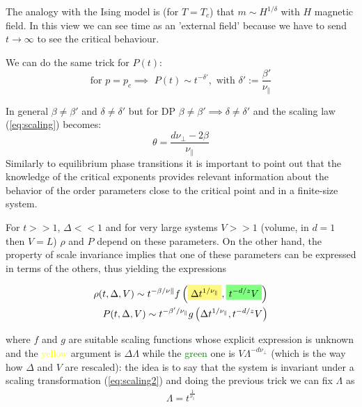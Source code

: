 \documentclass[\main/main.tex]{subfiles}
\begin{document}
The analogy with the Ising model is (for $T=T_c$) that $m\sim H^{1/\delta}$ with $H$ magnetic field. In this view we can see time as an 'external field' because we have to send $t \to \infty$ to see the critical behaviour.

We can do the same trick for $P(t)$:
\begin{equation}
    \text{for} \,\, p=p_c \implies\,\, P(t)\sim t^{-\delta'},\,\, \text{with} \,\, \delta':=\frac{\beta'}{\nu_\|}
\end{equation}

In general $\beta\neq \beta'$ and $\delta \neq \delta'$ but for DP $\beta\neq \beta' \implies \delta \neq \delta'$ and the scaling law (\ref{eq:scaling}) becomes:
\begin{equation}
    \theta=\frac{d\nu_\perp - 2\beta}{\nu_\|}
\end{equation}
Similarly to equilibrium phase transitions it is important to point out that the knowledge of the critical exponents provides relevant information about the behavior of the order parameters close to the critical point and in a finite-size system.

For $t>>1$, $\Delta << 1$ and for very large systems $V>>1$ (volume, in $d=1$ then $V=L$) $\rho$ and $P$ depend on these parameters. On the other hand, the property of scale invariance implies that one of these parameters can be expressed in terms of the others, thus yielding the expressions

\begin{align}
\rho(t, \Delta, V) \sim t^{-\beta / \nu \|} f\left(\hlc{yellow}{\Delta t^{1 / \nu_\|}}, \hlc{green}{t^{-d / z} V}\right) \\
P(t, \Delta, V) \sim t^{-\beta^{\prime} / \nu_{\|}} g\left(\Delta t^{1 / \nu_{\|}}, t^{-d / z} V\right)
\end{align}

where $f$ and $g$ are suitable scaling functions whose explicit expression is unknown and the \textcolor{yellow}{yellow} argument is $\Delta \Lambda$ while the \textcolor{green}{green} one is $V\Lambda^{-d\nu_\perp}$ (which is the way how $\Delta$ and $V$ are rescaled): the idea is to say that the system is invariant under a scaling transformation (\ref{eq:scaling2}) and doing the previous trick we can fix $\Lambda$ as
\begin{align}
    \Lambda=t^{\frac{1}{\nu_\|}}
\end{align}
\end{document}
